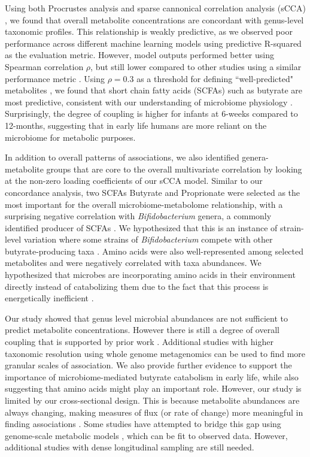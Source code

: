 Using both Procrustes analysis and sparse cannonical correlation analysis (sCCA) \cite{witten2009penalized}, we found that overall metabolite concentrations are concordant with genus-level taxonomic profiles. This relationship is weakly predictive, as we observed poor performance across different machine learning models using predictive R-squared as the evaluation metric. However, model outputs performed better using Spearman correlation $\rho$, but still lower compared to other studies using a similar performance metric \cite{mallick2019predictive}. Using $\rho = 0.3$ as a threshold for defining ``well-predicted" metabolites \cite{mallick2019predictive, muller2021metaanalysis}, we found that short chain fatty acids (SCFAs) such as butyrate are most predictive, consistent with our understanding of microbiome physiology \cite{leblanc2017beneficial}. Surprisingly, the degree of coupling is higher for infants at 6-weeks compared to 12-months, suggesting that in early life humans are more reliant on the microbiome for metabolic purposes. 

In addition to overall patterns of associations, we also identified genera-metabolite groups that are core to the overall multivariate correlation by looking at the non-zero loading coefficients of our sCCA model. Similar to our concordance analysis, two SCFAs Butyrate and Proprionate were selected as the most important for the overall microbiome-metabolome relationship, with a surprising negative correlation with \emph{Bifidobacterium} genera, a commonly identified producer of SCFAs \cite{james2019metabolism}. We hypothesized that this is an instance of strain-level variation where some strains of \emph{Bifidobacterium} compete with other butyrate-producing taxa \cite{riviere2016bifidobacteria}. Amino acids were also well-represented among selected metabolites and were negatively correlated with taxa abundances. We hypothesized that microbes are incorporating amino acids in their environment directly instead of catabolizing them due to the fact that this process is energetically inefficient \cite{franzosa2014relating, oliphant2019macronutrient}. 

Our study showed that genus level microbial abundances are not sufficient to predict metabolite concentrations. However there is still a degree of overall coupling that is supported by prior work \cite{ayeni2018infant, kisuse2018urban, zierer2018fecal}. Additional studies with higher taxonomic resolution using whole genome metagenomics can be used to find more granular scales of association. We also provide further evidence to support the importance of microbiome-mediated butyrate catabolism in early life, while also suggesting that amino acids might play an important role. However, our study is limited by our cross-sectional design. This is because metabolite abundances are always changing, making measures of flux (or rate of change) more meaningful in finding associations \cite{hollywood2006metabolomics}. Some studies have attempted to bridge this gap using genome-scale metabolic models \cite{noecker2019defining}, which can be fit to observed data. However, additional studies with dense longitudinal sampling are still needed.   

